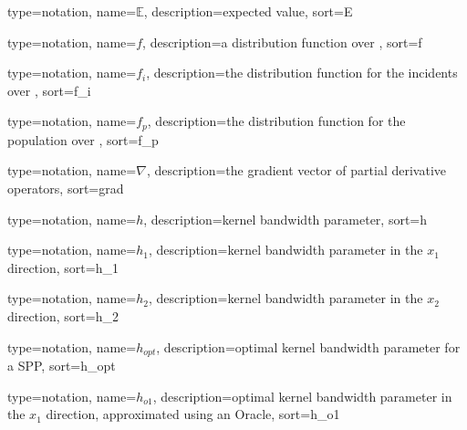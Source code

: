 

{%
   type=notation,
   name={\ensuremath{\mathbb{E}}},
   description={expected value},
   sort={E}
}

{%
   type=notation,
   name={\ensuremath{f}},
   description={a distribution function over },
   sort={f}
}

{%
   type=notation,
   name={\ensuremath{f_i}},
   description={the distribution function for the incidents over },
   sort={f_i}
}

{%
   type=notation,
   name={\ensuremath{f_p}},
   description={the distribution function for the population over },
   sort={f_p}
}

{%
   type=notation,
   name={\ensuremath{\nabla}},
   description={the gradient vector of partial derivative operators},
   sort={grad}
}

{%
   type=notation,
   name={\ensuremath{h}},
   description={kernel bandwidth parameter},
   sort={h}
}

{%
   type=notation,
   name={\ensuremath{h_1}},
   description={kernel bandwidth parameter in the \ensuremath{x_1} direction},
   sort={h_1}
}

{%
   type=notation,
   name={\ensuremath{h_2}},
   description={kernel bandwidth parameter in the \ensuremath{x_2} direction},
   sort={h_2}
}

{%
   type=notation,
   name={\ensuremath{h_{\mathit{opt}}}},
   description={optimal kernel bandwidth parameter for a SPP},
   sort={h_opt}
}

{%
   type=notation,
   name={\ensuremath{h_{o1}}},
   description={optimal kernel bandwidth parameter in the \ensuremath{x_1} direction, approximated using an Oracle},
   sort={h_o1}
}

